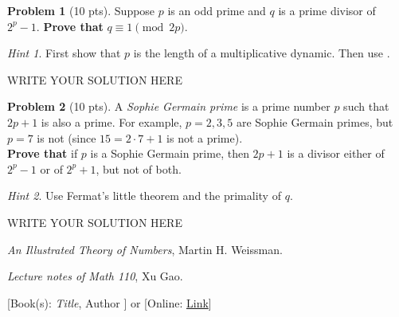 \documentclass[11pt]{article}
\theoremstyle{plain}
\theoremstyle{definition}
\newtheorem{problem}{Problem}
\theoremstyle{remark}
\newtheorem*{hint}{Hint}
\numberwithin{equation}{problem}
\begin{document}
\begin{problem}[10 pts]
	Suppose $p$ is an odd prime and $q$ is a prime divisor of $2^p - 1$. \textbf{Prove that} $q \equiv 1 \pmod{2p}$.
	\begin{hint}
		First show that $p$ is the length of a multiplicative dynamic. Then use \cite[Theorem 13.11]{LecNote}.
	\end{hint}
\end{problem}
\begin{solution} %
WRITE YOUR SOLUTION HERE
\end{solution}\clearpage %


\begin{problem}[10 pts]
	A \emph{Sophie Germain prime} is a prime number $p$ such that $2p + 1$ is also a prime. For example, $p = 2, 3, 5$ are Sophie Germain primes, but $p = 7$ is not (since $15 = 2\cdot 7 + 1$ is not a prime).\\
	\textbf{Prove that} if $p$ is a Sophie Germain prime, then $2p + 1$ is a divisor either of $2^p - 1$ or of $2^p + 1$, but not of both.
	\begin{hint}
		Use Fermat's little theorem and the primality of $q$.
	\end{hint}
\end{problem}
\begin{solution} %
WRITE YOUR SOLUTION HERE
\end{solution}\clearpage %

\begin{thebibliography}{9}  %
	\emph{An Illustrated Theory of Numbers}, Martin H. Weissman.

	\emph{Lecture notes of Math 110}, Xu Gao.
	
	[Book(s): \emph{Title}, Author ] or [Online: \href{http://example.com/}{Link}]
\end{thebibliography}  %
\end{document}
